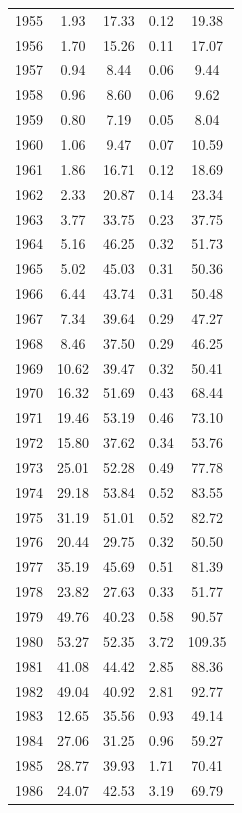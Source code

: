 \documentclass[12pt,]{article}
\begin{document}
\begin{longtable}{ccccc}
  1955 & 1.93 & 17.33 & 0.12 & 19.38 \\ 
  1956 & 1.70 & 15.26 & 0.11 & 17.07 \\ 
  1957 & 0.94 & 8.44 & 0.06 & 9.44 \\ 
  1958 & 0.96 & 8.60 & 0.06 & 9.62 \\ 
  1959 & 0.80 & 7.19 & 0.05 & 8.04 \\ 
  1960 & 1.06 & 9.47 & 0.07 & 10.59 \\ 
  1961 & 1.86 & 16.71 & 0.12 & 18.69 \\ 
  1962 & 2.33 & 20.87 & 0.14 & 23.34 \\ 
  1963 & 3.77 & 33.75 & 0.23 & 37.75 \\ 
  1964 & 5.16 & 46.25 & 0.32 & 51.73 \\ 
  1965 & 5.02 & 45.03 & 0.31 & 50.36 \\ 
  1966 & 6.44 & 43.74 & 0.31 & 50.48 \\ 
  1967 & 7.34 & 39.64 & 0.29 & 47.27 \\ 
  1968 & 8.46 & 37.50 & 0.29 & 46.25 \\ 
  1969 & 10.62 & 39.47 & 0.32 & 50.41 \\ 
  1970 & 16.32 & 51.69 & 0.43 & 68.44 \\ 
  1971 & 19.46 & 53.19 & 0.46 & 73.10 \\ 
  1972 & 15.80 & 37.62 & 0.34 & 53.76 \\ 
  1973 & 25.01 & 52.28 & 0.49 & 77.78 \\ 
  1974 & 29.18 & 53.84 & 0.52 & 83.55 \\ 
  1975 & 31.19 & 51.01 & 0.52 & 82.72 \\ 
  1976 & 20.44 & 29.75 & 0.32 & 50.50 \\ 
  1977 & 35.19 & 45.69 & 0.51 & 81.39 \\ 
  1978 & 23.82 & 27.63 & 0.33 & 51.77 \\ 
  1979 & 49.76 & 40.23 & 0.58 & 90.57 \\ 
  1980 & 53.27 & 52.35 & 3.72 & 109.35 \\ 
  1981 & 41.08 & 44.42 & 2.85 & 88.36 \\ 
  1982 & 49.04 & 40.92 & 2.81 & 92.77 \\ 
  1983 & 12.65 & 35.56 & 0.93 & 49.14 \\ 
  1984 & 27.06 & 31.25 & 0.96 & 59.27 \\ 
  1985 & 28.77 & 39.93 & 1.71 & 70.41 \\ 
  1986 & 24.07 & 42.53 & 3.19 & 69.79 \\ 

\end{longtable}
\end{document}

